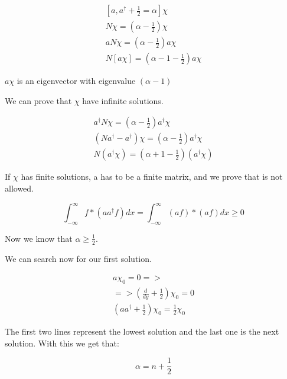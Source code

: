 \begin{equation}
  \begin{array}{c}
    [a,a^\dagger+\frac{1}{2}=\alpha]\chi
    \\
    N\chi = \left(\alpha-\frac{1}{2}\right)\chi
    \\
    aN\chi = \left(\alpha-\frac{1}{2}\right)a\chi
    \\
    N[a\chi]=\left(\alpha-1-\frac{1}{2}\right)a\chi
  \end{array}
\end{equation}

$a\chi$ is an eigenvector with eigenvalue $(\alpha-1)$

We can prove that $\chi$ have infinite solutions.

\begin{equation}
  \begin{array}{c}
    a^\dagger N \chi = \left(\alpha - \frac{1}{2}\right)a^{\dagger}\chi
    \\
    (Na^\dagger-a^\dagger) \chi = \left(\alpha - \frac{1}{2}\right)a^{\dagger}\chi
    \\
    N(a^\dagger\chi)=\left(\alpha+1-\frac{1}{2}\right)(a^\dagger\chi)
  \end{array}
\end{equation}

If $\chi$ has finite solutions, a has to be a finite matrix, and we prove that is not allowed.

\begin{equation}
  \int_{-\infty}^{\infty} f*(aa^\dagger f)dx = \int_{-\infty}^{\infty} (af)*(af) dx \geq 0
\end{equation}

Now we know that $\alpha \geq\frac{1}{2}$.

We can search now for our first solution.

\begin{equation}
  \begin{array}{c}
    a\chi_0 = 0 =>
    \\
    => \left(\frac{d}{dy}+\frac{1}{2}\right)\chi_0 = 0
    \\
    \left(aa^\dagger+\frac{1}{2}\right)\chi_0 = \frac{1}{2} \chi_0
  \end{array}
\end{equation}

The first two lines represent the lowest solution and the last one is the next solution. With this we get that:

\begin{equation}
  \alpha = n+\frac{1}{2}
\end{equation}

